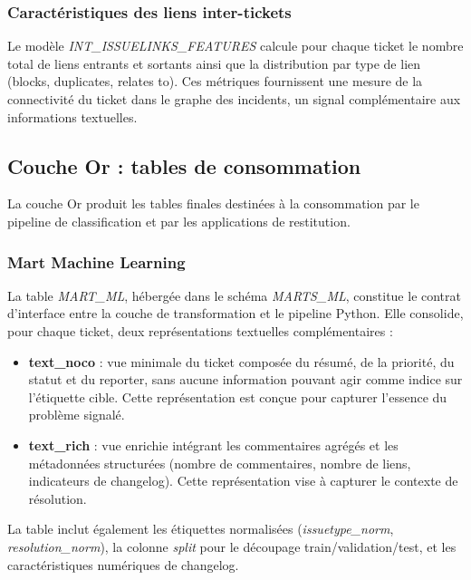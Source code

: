 \subsubsection{Caractéristiques des liens inter-tickets}

Le modèle \textit{INT\_ISSUELINKS\_FEATURES} calcule pour chaque ticket le nombre total de liens entrants et sortants ainsi que la distribution par type de lien (blocks, duplicates, relates to). Ces métriques fournissent une mesure de la connectivité du ticket dans le graphe des incidents, un signal complémentaire aux informations textuelles.

\subsection{Couche Or : tables de consommation}

La couche Or produit les tables finales destinées à la consommation par le pipeline de classification et par les applications de restitution.

\subsubsection{Mart Machine Learning}

La table \textit{MART\_ML}, hébergée dans le schéma \textit{MARTS\_ML}, constitue le contrat d'interface entre la couche de transformation et le pipeline Python. Elle consolide, pour chaque ticket, deux représentations textuelles complémentaires :

\begin{itemize}
    \item \textbf{text\_noco} : vue minimale du ticket composée du résumé, de la priorité, du statut et du reporter, sans aucune information pouvant agir comme indice sur l'étiquette cible. Cette représentation est conçue pour capturer l'essence du problème signalé.
    \item \textbf{text\_rich} : vue enrichie intégrant les commentaires agrégés et les métadonnées structurées (nombre de commentaires, nombre de liens, indicateurs de changelog). Cette représentation vise à capturer le contexte de résolution.
\end{itemize}

La table inclut également les étiquettes normalisées (\textit{issuetype\_norm}, \textit{resolution\_norm}), la colonne \textit{split} pour le découpage train/validation/test, et les caractéristiques numériques de changelog.

